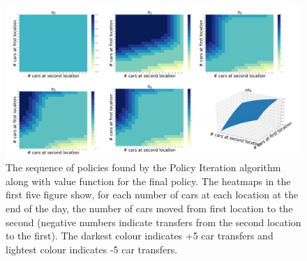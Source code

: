 \documentclass{article}
\begin{document}
\begin{figure}[H]
    \graphicspath{ {../Experiments/JackRentalProblem/PolicyIteration/} }
    \begin{center}
    \includegraphics[width=15cm]{Compact1.png}
    \end{center}
    \caption{The sequence of policies found by the Policy Iteration algorithm along with value function for the final policy. The
    heatmaps in the first five figure show, for each number of cars at each location at the end of the day, the number of cars moved
    from first location to the second (negative numbers indicate transfers from the second location to the first). The darkest 
    colour indicates +5 car transfers and lightest colour indicates -5 car transfers.}
\end{figure}
\end{document}
